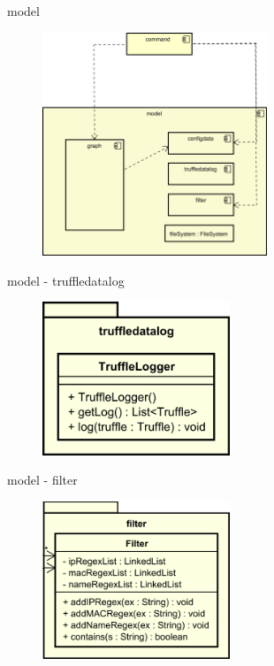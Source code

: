 \begin{frame}{model}
  \begin{figure}
    \centering
    \includegraphics[width=0.6\textwidth]{./images/model.png}
  \end{figure}
\end{frame}

\begin{frame}{model - truffledatalog}
  \begin{figure}
    \centering
    \includegraphics[width=0.5\textwidth]{./images/truffledatalog.png}
  \end{figure}
\end{frame}

\begin{frame}{model - filter}
  \begin{figure}
    \centering
    \includegraphics[width=0.5\textwidth]{./images/filter.png}
  \end{figure}
\end{frame}

